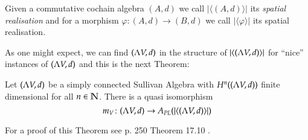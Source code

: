  \begin{Definition}
  Given a commutative cochain algebra $(A,d)$ we call $| \langle (A,d) \rangle |$ its \emph{spatial realisation} and for
  a morphism $\varphi \colon (A,d) \to (B,d)$ we call $|\langle \varphi \rangle|$ its spatial realisation.
 \end{Definition}

 As one might expect, we can find $(\Lambda V,d)$ in the structure of  $| \langle (\Lambda V,d) \rangle |$ for ``nice'' 
 instances of $(\Lambda V,d)$ and this is the next Theorem:
 
 \begin{Theorem}
  Let $(\Lambda V,d)$ be a simply connected Sullivan Algebra with $H^n((\Lambda V,d))$ finite dimensional for all $n \in \mathbb{N}$.
  There is a quasi isomorphism
  $$m_V \colon (\Lambda V,d) \to A_{PL}(| \langle (\Lambda V,d) \rangle |)$$
 \end{Theorem}

 For a proof of this Theorem see \cite{Felix2001} p. 250 Theorem 17.10 .
 
 